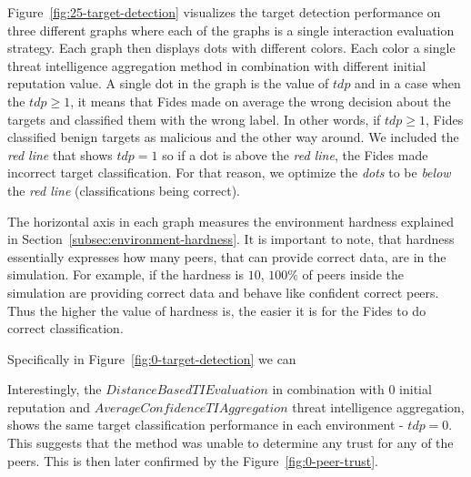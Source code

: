 Figure~\ref{fig:25-target-detection} visualizes the target detection performance on three different graphs where each of the graphs is a single interaction evaluation strategy.
Each graph then displays dots with different colors. Each color a single threat intelligence aggregation method in combination with different initial reputation value.
A single dot in the graph is the value of $tdp$ and in a case when the $tdp \geq 1$, it means that Fides made on average the wrong decision about the targets and classified them with the wrong label.
In other words, if $tdp \geq 1$, Fides classified benign targets as malicious and the other way around.
We included the \textit{red line} that shows $tdp = 1$ so if a dot is above the \textit{red line}, the Fides made incorrect target classification.
For that reason, we optimize the \textit{dots} to be \textit{below} the \textit{red line} (classifications being correct).

The horizontal axis in each graph measures the environment hardness explained in Section~\ref{subsec:environment-hardness}. It is important to note, that hardness essentially expresses how many peers, that can provide correct data, are in the simulation. For example, if the hardness is $10$, $100\%$ of peers inside the simulation are providing correct data and behave like confident correct peers.
Thus the higher the value of hardness is, the easier it is for the Fides to do correct classification.

Specifically in Figure~\ref{fig:0-target-detection} we can 

Interestingly, the $DistanceBasedTIEvaluation$ in combination with $0$ initial reputation and $AverageConfidenceTIAggregation$ threat intelligence aggregation, shows the same target classification performance in each environment - $tdp = 0$. This suggests that the method was unable to determine any trust for any of the peers. This is then later confirmed by the Figure~\ref{fig:0-peer-trust}.


